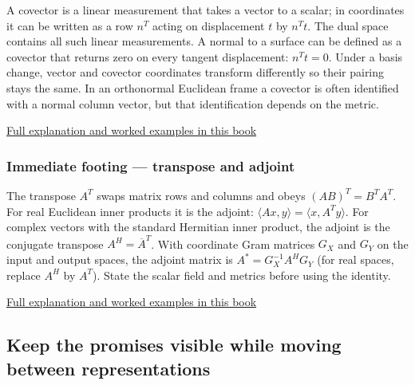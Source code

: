 \hypertarget{01-foundations-i-ch018-immediate-footing-covector-and-dual-space}{}

A covector is a linear measurement that takes a vector to a scalar; in coordinates it can be written as a row \(n^T\) acting on displacement \(t\) by \(n^Tt\). The dual space contains all such linear measurements. A normal to a surface can be defined as a covector that returns zero on every tangent displacement: \(n^Tt=0\). Under a basis change, vector and covector coordinates transform differently so their pairing stays the same. In an orthonormal Euclidean frame a covector is often identified with a normal column vector, but that identification depends on the metric.

\hyperref[01-foundations-i-ch018-a-normal-is-a-measuring-rule-before-it-is-an-arrow]{Full explanation and worked examples in this book}

\subsubsection{Immediate footing --- transpose and adjoint}\label{01-foundations-i-ch018-immediate-footing-transpose-and-adjoint}

\hypertarget{01-foundations-i-ch018-immediate-footing-transpose-and-adjoint}{}

The transpose \(A^T\) swaps matrix rows and columns and obeys \((AB)^T=B^TA^T\). For real Euclidean inner products it is the adjoint: \(\langle Ax,y\rangle=\langle x,A^Ty\rangle\). For complex vectors with the standard Hermitian inner product, the adjoint is the conjugate transpose \(A^H=\overline{A}^T\). With coordinate Gram matrices \(G_X\) and \(G_Y\) on the input and output spaces, the adjoint matrix is \(A^*=G_X^{-1}A^HG_Y\) (for real spaces, replace \(A^H\) by \(A^T\)). State the scalar field and metrics before using the identity.

\hyperref[01-foundations-i-ch018-transpose-lets-us-compare-measurements-and-structure]{Full explanation and worked examples in this book}

\subsection{Keep the promises visible while moving between representations}\label{01-foundations-i-ch018-keep-the-promises-visible-while-moving-between-representations}

\hypertarget{01-foundations-i-ch018-keep-the-promises-visible-while-moving-between-representations}{}


